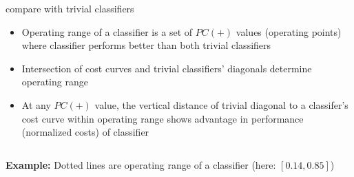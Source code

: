 \documentclass[11pt,compress,t,notes=noshow, xcolor=table]{beamer}
\begin{document}

\begin{vbframe}{compare with trivial classifiers}
  \begin{itemize}
    \item Operating range of a classifier is a set of $PC(+)$ values (operating points) where classifier performs better than both trivial classifiers
    \item Intersection of cost curves and trivial classifiers' diagonals determine operating range
    \item At any $PC(+)$ value, the vertical distance of trivial diagonal to a classifer's cost curve within operating range shows advantage in performance (normalized costs) of classifier %
  \end{itemize}
\begin{columns}[T]
\begin{column}{0.6\textwidth}
\textbf{Example:} Dotted lines are operating range of a classifier (here: $[0.14, 0.85]$)
\end{column}
\end{columns}
\end{vbframe}
\end{document}
